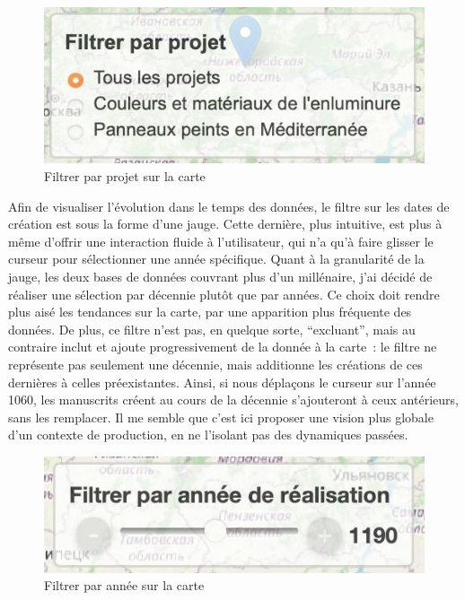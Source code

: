 \begin{figure}[H]
	\centering
    \includegraphics[scale=0.4]{./textes/chap2/filtre-projet.jpg}
	\caption{Filtrer par projet sur la carte}
	\label{fig:info}
\end{figure}

Afin de visualiser l’évolution dans le temps des données, le filtre sur les dates de création est sous la forme d’une jauge. Cette dernière, plus intuitive, est plus à même d’offrir une interaction fluide à l’utilisateur, qui n’a qu’à faire glisser le curseur pour sélectionner une année spécifique. Quant à la granularité de la jauge, les deux bases de données couvrant plus d’un millénaire, j’ai décidé de réaliser une sélection par décennie plutôt que par années. Ce choix doit rendre plus aisé les tendances sur la carte, par une apparition plus fréquente des données. De plus, ce filtre n’est pas, en quelque sorte, \enquote{excluant}, mais au contraire inclut et ajoute progressivement de la donnée à la carte~: le filtre ne représente pas seulement une décennie, mais additionne les créations de ces dernières à celles préexistantes. Ainsi, si nous déplaçons le curseur sur l’année 1060, les manuscrits créent au cours de la décennie s’ajouteront à ceux antérieurs, sans les remplacer. Il me semble que c’est ici proposer une vision plus globale d’un contexte de production, en ne l’isolant pas des dynamiques passées.\par

\begin{figure}[H]
	\centering
	\includegraphics[scale=0.3]{./textes/chap2/filtre-annee.jpg}
	\caption{Filtrer par année sur la carte}
	\label{fig:info}
\end{figure}

